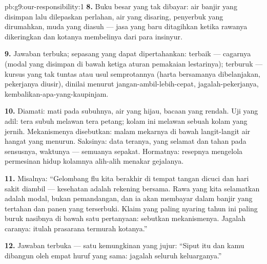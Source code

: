 \begin{solution}{pb:g9:our-responsibility:1}
\textbf{8.} Buku besar yang tak dibayar: air banjir yang
disimpan lalu dilepaskan perlahan, air yang disaring,
penyerbuk yang dirumahkan,  muda yang diasuh --- jasa
yang baru ditagihkan ketika rawanya dikeringkan dan kotanya
membelinya dari para insinyur.

\textbf{9.} Jawaban terbuka; sepasang yang dapat
dipertahankan: terbaik --- cagarnya (modal yang disimpan di
bawah ketiga aturan pemakaian lestarinya); terburuk ---
kursus yang tak tuntas atau usul semprotannya (harta
bersamanya dibelanjakan, pekerjanya diusir), dinilai menurut
jangan-ambil-lebih-cepat, jagalah-pekerjanya,
kembalikan-apa-yang-kaupinjam.

\textbf{10.} Diamati:  mati pada subuhnya, air yang
hijau, bacaan yang rendah. Uji yang adil: tera subuh melawan
tera petang; kolam ini melawan sebuah kolam yang jernih.
Mekanismenya disebutkan:  malam mekarnya di bawah
langit-langit air hangat yang menurun. Saksinya: data
teranya, yang selamat dan tahan pada sensusnya, waktunya ---
semuanya sepakat. Hormatnya: resepnya mengelola permesinan
hidup kolamnya alih-alih menakar gejalanya.

\textbf{11.} Misalnya: ``Gelombang flu kita berakhir di
tempat tangan dicuci dan hari sakit diambil --- kesehatan
adalah rekening bersama. Rawa yang kita selamatkan adalah
modal, bukan pemandangan, dan ia akan membayar dalam banjir
yang tertahan dan panen yang terserbuki. Klaim yang paling
nyaring tahun ini paling buruk nasibnya di bawah satu
pertanyaan: sebutkan mekanismenya. Jagalah caranya: itulah
prasarana termurah kotanya.''

\textbf{12.} Jawaban terbuka --- satu kemungkinan yang
jujur: ``Siput itu dan kamu dibangun oleh empat huruf yang
sama: jagalah seluruh keluarganya.''
\end{solution}
